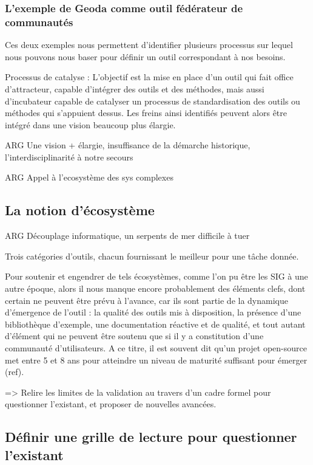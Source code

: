 \subsubsection{L'exemple de Geoda comme outil fédérateur de communautés}

Ces deux exemples nous permettent d'identifier plusieurs processus sur lequel nous pouvons nous baser pour définir un outil correspondant à nos besoins. 

Processus de catalyse : L'objectif est la mise en place d'un outil qui fait office d'attracteur,  capable d'intégrer des outils et des méthodes, mais aussi d'incubateur capable de catalyser un processus de standardisation des outils ou méthodes qui s'appuient dessus. Les freins ainsi identifiés peuvent alors être intégré dans une vision beaucoup plus élargie.

 ARG Une vision + élargie, insuffisance de la démarche historique, l'interdisciplinarité à notre secours 
 
 ARG Appel à l'ecosystème des sys complexes

\subsection{La notion d'écosystème}

ARG Découplage informatique, un serpents de mer difficile à tuer

Trois catégories d'outils, chacun fournissant le meilleur pour une tâche donnée.

Pour soutenir et engendrer de tels écosystèmes, comme l'on pu être les SIG à une autre époque, alors il nous manque encore probablement des éléments clefs, dont certain ne peuvent être prévu à l'avance, car ils sont partie de la dynamique d'émergence de l'outil : la qualité des outils mis à disposition, la présence d'une bibliothèque d'exemple, une documentation réactive et de qualité, et tout autant d'élément qui ne peuvent être soutenu que si il y a constitution d'une communauté d'utilisateurs. A ce titre, il est souvent dit qu'un projet open-source met entre 5 et 8 ans pour atteindre un niveau de maturité suffisant pour émerger (ref).

 => Relire les limites de la validation au travers d'un cadre formel pour questionner l'existant, et proposer de nouvelles avancées.

\subsection{Définir une grille de lecture pour questionner l'existant}


